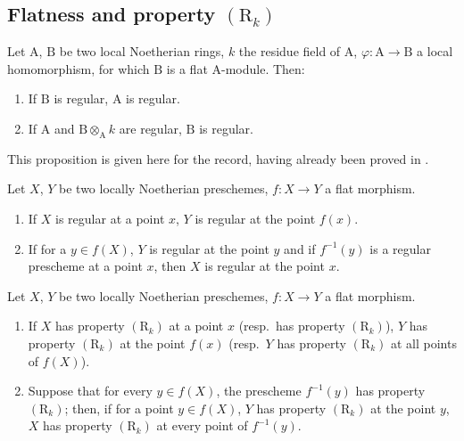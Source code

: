 \subsection{Flatness and property \texorpdfstring{$(\mathrm{R}_k)$}{(Rk)}}
\label{subsection:IV.6.5}

\begin{proposition}[6.5.1]
\label{IV.6.5.1}
Let $\mathrm{A}$, $\mathrm{B}$ be two local Noetherian rings, $k$ the residue field of $\mathrm{A}$, $\varphi:\mathrm{A}\to\mathrm{B}$ a local homomorphism, for which $\mathrm{B}$ is a flat $\mathrm{A}$-module.
Then:
\begin{enumerate}[label=(\roman*)]
  \item If $\mathrm{B}$ is regular, $\mathrm{A}$ is regular.
  \item If $\mathrm{A}$ and $\mathrm{B}\otimes_\mathrm{A} k$ are regular, $\mathrm{B}$ is regular.
\end{enumerate}
This proposition is given here for the record, having already been proved in .
\end{proposition}

\begin{corollary}[6.5.2]
\label{IV.6.5.2}
Let $X$, $Y$ be two locally Noetherian preschemes, $f:X\to Y$ a flat morphism.
\begin{enumerate}[label=(\roman*)]
  \item If $X$ is regular at a point $x$, $Y$ is regular at the point $f(x)$.
  \item If for a $y\in f(X)$, $Y$ is regular at the point $y$ and if $f^{-1}(y)$ is a regular prescheme at a point $x$, then $X$ is regular at the point $x$.
\end{enumerate}
\end{corollary}

\begin{proposition}[6.5.3]
\label{IV.6.5.3}
Let $X$, $Y$ be two locally Noetherian preschemes, $f:X\to Y$ a flat morphism.
\begin{enumerate}[label=(\roman*)]
  \item If $X$ has property $(\mathrm{R}_k)$ at a point $x$ \textnormal{(}resp.\ has property $(\mathrm{R}_k)$\textnormal{)}, $Y$ has property $(\mathrm{R}_k)$ at the point $f(x)$ \textnormal{(}resp.\ $Y$ has property $(\mathrm{R}_k)$ at all points of $f(X)$\textnormal{)}.
  \item Suppose that for every $y\in f(X)$, the prescheme $f^{-1}(y)$ has property $(\mathrm{R}_k)$; then, if for a point $y\in f(X)$, $Y$ has property $(\mathrm{R}_k)$ at the point $y$, $X$ has property $(\mathrm{R}_k)$ at every point of $f^{-1}(y)$.
\end{enumerate}
\end{proposition}

